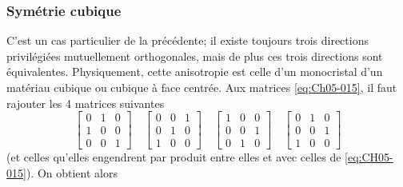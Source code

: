 \subsubsection{Symétrie cubique}
C'est un cas particulier de la précédente; il existe toujours trois directions privilégiées mutuellement orthogonales, mais de plus ces trois directions sont équivalentes.
Physiquement, cette anisotropie est celle d'un monocristal d'un matériau cubique ou cubique à face centrée.
Aux matrices \eqref{eq:Ch05-015}, il faut rajouter les 4 matrices suivantes 
\begin{equation}
    \begin{bmatrix}
        0 & 1 & 0 \\
        1 & 0 & 0 \\
        0 & 0 & 1
    \end{bmatrix}
    \quad
    \begin{bmatrix}
        0 & 0 & 1 \\
        0 & 1 & 0 \\
        1 & 0 & 0
    \end{bmatrix}
    \quad
    \begin{bmatrix}
        1 & 0 & 0 \\
        0 & 0 & 1 \\
        0 & 1 & 0
    \end{bmatrix}
    \quad
    \begin{bmatrix}
        0 & 1 & 0 \\
        0 & 0 & 1 \\
        1 & 0 & 0
    \end{bmatrix}
    \label{eq:Ch05-017}
\end{equation}
(et celles qu'elles engendrent par produit entre elles et avec celles de \eqref{eq:CH05-015}).
On obtient alors 
